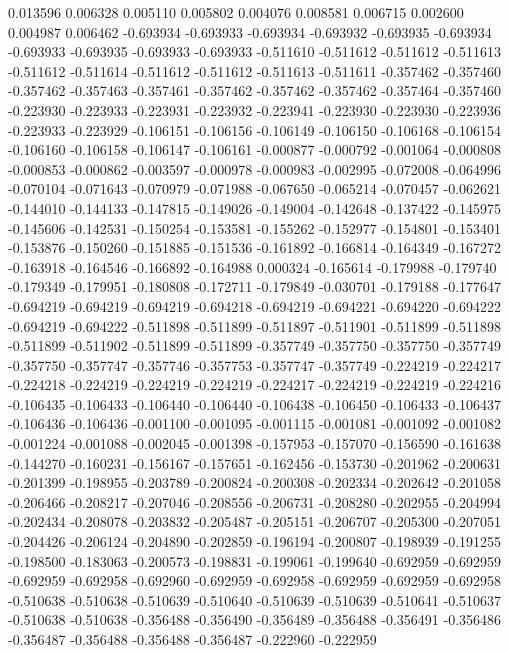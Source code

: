 0.013596
0.006328
0.005110
0.005802
0.004076
0.008581
0.006715
0.002600
0.004987
0.006462
-0.693934
-0.693933
-0.693934
-0.693932
-0.693935
-0.693934
-0.693933
-0.693935
-0.693933
-0.693933
-0.511610
-0.511612
-0.511612
-0.511613
-0.511612
-0.511614
-0.511612
-0.511612
-0.511613
-0.511611
-0.357462
-0.357460
-0.357462
-0.357463
-0.357461
-0.357462
-0.357462
-0.357462
-0.357464
-0.357460
-0.223930
-0.223933
-0.223931
-0.223932
-0.223941
-0.223930
-0.223930
-0.223936
-0.223933
-0.223929
-0.106151
-0.106156
-0.106149
-0.106150
-0.106168
-0.106154
-0.106160
-0.106158
-0.106147
-0.106161
-0.000877
-0.000792
-0.001064
-0.000808
-0.000853
-0.000862
-0.003597
-0.000978
-0.000983
-0.002995
-0.072008
-0.064996
-0.070104
-0.071643
-0.070979
-0.071988
-0.067650
-0.065214
-0.070457
-0.062621
-0.144010
-0.144133
-0.147815
-0.149026
-0.149004
-0.142648
-0.137422
-0.145975
-0.145606
-0.142531
-0.150254
-0.153581
-0.155262
-0.152977
-0.154801
-0.153401
-0.153876
-0.150260
-0.151885
-0.151536
-0.161892
-0.166814
-0.164349
-0.167272
-0.163918
-0.164546
-0.166892
-0.164988
0.000324
-0.165614
-0.179988
-0.179740
-0.179349
-0.179951
-0.180808
-0.172711
-0.179849
-0.030701
-0.179188
-0.177647
-0.694219
-0.694219
-0.694219
-0.694218
-0.694219
-0.694221
-0.694220
-0.694222
-0.694219
-0.694222
-0.511898
-0.511899
-0.511897
-0.511901
-0.511899
-0.511898
-0.511899
-0.511902
-0.511899
-0.511899
-0.357749
-0.357750
-0.357750
-0.357749
-0.357750
-0.357747
-0.357746
-0.357753
-0.357747
-0.357749
-0.224219
-0.224217
-0.224218
-0.224219
-0.224219
-0.224219
-0.224217
-0.224219
-0.224219
-0.224216
-0.106435
-0.106433
-0.106440
-0.106440
-0.106438
-0.106450
-0.106433
-0.106437
-0.106436
-0.106436
-0.001100
-0.001095
-0.001115
-0.001081
-0.001092
-0.001082
-0.001224
-0.001088
-0.002045
-0.001398
-0.157953
-0.157070
-0.156590
-0.161638
-0.144270
-0.160231
-0.156167
-0.157651
-0.162456
-0.153730
-0.201962
-0.200631
-0.201399
-0.198955
-0.203789
-0.200824
-0.200308
-0.202334
-0.202642
-0.201058
-0.206466
-0.208217
-0.207046
-0.208556
-0.206731
-0.208280
-0.202955
-0.204994
-0.202434
-0.208078
-0.203832
-0.205487
-0.205151
-0.206707
-0.205300
-0.207051
-0.204426
-0.206124
-0.204890
-0.202859
-0.196194
-0.200807
-0.198939
-0.191255
-0.198500
-0.183063
-0.200573
-0.198831
-0.199061
-0.199640
-0.692959
-0.692959
-0.692959
-0.692958
-0.692960
-0.692959
-0.692958
-0.692959
-0.692959
-0.692958
-0.510638
-0.510638
-0.510639
-0.510640
-0.510639
-0.510639
-0.510641
-0.510637
-0.510638
-0.510638
-0.356488
-0.356490
-0.356489
-0.356488
-0.356491
-0.356486
-0.356487
-0.356488
-0.356488
-0.356487
-0.222960
-0.222959

